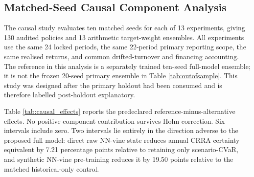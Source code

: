 \subsection{Matched-Seed Causal Component Analysis}
\label{subsec:4_ablation}

The causal study evaluates ten matched seeds for each of 13 experiments, giving 130 audited policies and 13 arithmetic target-weight ensembles. All experiments use the same 24 locked periods, the same 22-period primary reporting scope, the same realised returns, and common drifted-turnover and financing accounting. The reference in this analysis is a separately trained ten-seed full-model ensemble; it is not the frozen 20-seed primary ensemble in Table \ref{tab:outofsample}. This study was designed after the primary holdout had been consumed and is therefore labelled post-holdout explanatory.

Table \ref{tab:causal_effects} reports the predeclared reference-minus-alternative effects. No positive component contribution survives Holm correction. Six intervals include zero. Two intervals lie entirely in the direction adverse to the proposed full model: direct raw NN-vine state reduces annual CRRA certainty equivalent by 7.21 percentage points relative to retaining only scenario-CVaR, and synthetic NN-vine pre-training reduces it by 19.50 points relative to the matched historical-only control.

